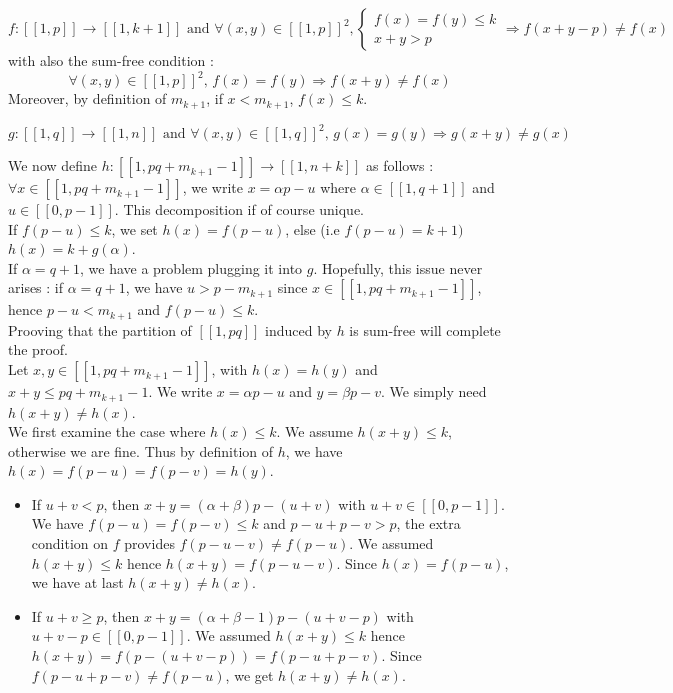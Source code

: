 \[ f : [\![1,p]\!] \longrightarrow [\![1,k+1]\!] \text{ and } \forall (x,y) \in [\![1,p]\!]^2, \left\{
\begin{array}{ll}
	f(x) = f(y) \leqslant k \\
	x + y > p
\end{array}
\right.
\Longrightarrow f(x+y-p) \neq f(x)
\]
with also the sum-free condition : \[ \forall (x,y) \in [\![1,p]\!]^2 \text{, } f(x) = f(y)
\Longrightarrow f(x+y) \neq f(x) \]
Moreover, by definition of \(m_{k+1}\), if \(x < m_{k+1}\), \(f(x) \leqslant k\).

\[g : [\![1,q]\!] \longrightarrow [\![1,n]\!] \text{ and } \forall (x,y) \in [\![1,q]\!]^2 \text{, } g(x) = g(y)
\Longrightarrow g(x+y) \neq g(x)
\]

We now define \(h : [\![1,pq+m_{k+1}-1]\!] \longrightarrow [\![1,n+k]\!] \) as follows :
\( \forall x \in [\![1,pq + m_{k+1}-1]\!] \), we write \(x = \alpha p - u\) where \(\alpha \in [\![1,q+1]\!] \) and \( u \in
[\![0,p-1]\!] \).
This decomposition if of course unique. \\

If \(f(p-u) \leqslant k\), we set \(h(x) = f(p-u)\), else (i.e \(f(p-u) = k + 1)\) \(h(x) = k + g(\alpha) \). \\
If \(\alpha = q+1\), we have a problem plugging it into \(g\). Hopefully, this issue never arises : if 
\(\alpha = q+1\), we have \(u > p - m_{k+1}\) since \(x \in [\![1,pq + m_{k+1}-1]\!]\), hence \(p-u < m_{k+1}\) and \(f(p-u) \leqslant k\). \\

Prooving that the partition of \([\![1,pq]\!]\) induced by \(h\) is sum-free will complete the proof.\\

Let \(x,y \in [\![1,pq + m_{k+1}-1]\!]\), with \(h(x) = h(y)\) and \(x+y \leqslant pq+m_{k+1}-1\). We write \(x = \alpha p - u\) and \(y =
\beta p - v\). We simply need \(h(x+y) \neq h(x)\). \\

We first examine the case where \(h(x) \leqslant k\). We assume \(h(x+y) \leqslant k\), otherwise we are fine. 
Thus by definition of \(h\), we have \(h(x) = f(p-u) = f(p-v) = h(y)\).
\begin{itemize}
\item If \(u+v < p\), then \(x+y = (\alpha+\beta)p - (u+v) \) with \(u+v \in [\![0,p-1]\!] \).
We have \(f(p-u) = f(p-v) \leqslant k\) and \(p-u + p-v > p\), the extra condition on \(f\) provides \(f(p-u-v) \neq
f(p-u)\).
We assumed \(h(x+y) \leqslant k\) hence \(h(x+y) = f(p-u-v)\). Since \(h(x) = f(p-u)\), we have at last \(h(x+y) \neq
h(x)\).
\item If \(u+v \geqslant p\), then \(x+y = (\alpha+\beta-1)p - (u+v-p) \) with \(u+v-p \in [\![0,p-1]\!] \).
We assumed \(h(x+y) \leqslant k \) hence \(h(x+y) = f( p- (u+v-p)) = f(p-u + p-v)\). Since \(f(p-u+p-v) \neq f(p-u)\),
we get \(h(x+y) \neq h(x)\).
\end{itemize} 
  
